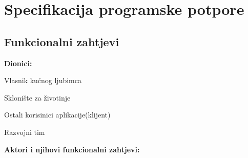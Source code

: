 \chapter{Specifikacija programske potpore}

\section{Funkcionalni zahtjevi}


\noindent \textbf{Dionici:}

\begin{packed_enum}

	\item Vlasnik kućnog ljubimca
	\item Sklonište za životinje
	\item Ostali korisinici aplikacije(klijent)
	\item Razvojni tim

\end{packed_enum}

\noindent \textbf{Aktori i njihovi funkcionalni zahtjevi:}


